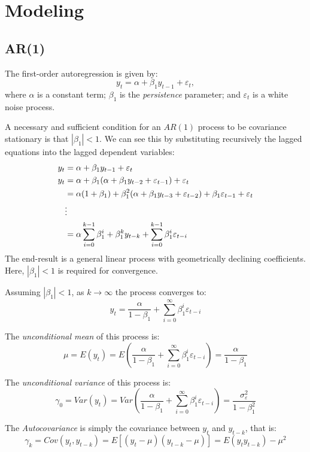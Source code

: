 \documentclass[
  oneside]{book}
\begin{document}
\hypertarget{modeling-2}{%
\section{Modeling}\label{modeling-2}}

\hypertarget{ar1}{%
\subsection{AR(1)}\label{ar1}}

The first-order autoregression is given by: \[y_t = \alpha + \beta_1 y_{t-1} + \varepsilon_t,\] where \(\alpha\) is a constant term; \(\beta_1\) is the \emph{persistence} parameter; and \(\varepsilon_t\) is a white noise process.

A necessary and sufficient condition for an \(AR(1)\) process to be covariance stationary is that \(|\beta_1| < 1\). We can see this by substituting recursively the lagged equations into the lagged dependent variables:
\[
\begin{aligned}
y_t &= \alpha + \beta_1 y_{t-1} + \varepsilon_t \notag \\
y_t &= \alpha + \beta_1 (\alpha + \beta_1 y_{t-2} + \varepsilon_{t-1}) + \varepsilon_t \notag \\
&= \alpha(1+\beta_1) + \beta_1^2 (\alpha + \beta_1 y_{t-3} + \varepsilon_{t-2}) + \beta_1\varepsilon_{t-1} + \varepsilon_t \notag \\
&\vdots  \notag \\
&= \alpha\sum_{i=0}^{k-1}\beta_1^i + \beta_1^k y_{t-k} + \sum_{i=0}^{k-1}\beta_1^i\varepsilon_{t-i}
\end{aligned}
\]
The end-result is a general linear process with geometrically declining coefficients. Here, \(|\beta_1| < 1\) is required for convergence.

Assuming \(|\beta_1| < 1\), as \(k \to \infty\) the process converges to: \[y_t = \frac{\alpha}{1-\beta_1} + \sum_{i=0}^{\infty}\beta_1^i\varepsilon_{t-i}\]

The \emph{unconditional mean} of this process is: \[\mu = E\left(y_t\right) = E\left(\frac{\alpha}{1-\beta_1} + \sum_{i=0}^{\infty}\beta_1^i\varepsilon_{t-i}\right) = \frac{\alpha}{1-\beta_1}\]

The \emph{unconditional variance} of this process is: \[\gamma_0 = Var\left(y_t\right) = Var\left(\frac{\alpha}{1-\beta_1} + \sum_{i=0}^{\infty}\beta_1^i\varepsilon_{t-i}\right) = \frac{\sigma_{\varepsilon}^2}{1-\beta_1^2}\]

The \emph{Autocovariance} is simply the covariance between \(y_t\) and \(y_{t-k}\), that is: \[\gamma_k = Cov(y_t,y_{t-k}) = E[(y_t - \mu)(y_{t-k} - \mu)] = E(y_t y_{t-k}) - \mu^2\]
\end{document}
